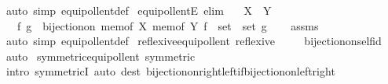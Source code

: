 \begin{isabellebody}
\ {\isacharparenleft}{\kern0pt}auto\ simp{\isacharcolon}{\kern0pt}\ equipollent{\isacharunderscore}{\kern0pt}def{\isacharparenright}{\kern0pt}%
\endisatagproof
{\isafoldproof}%
%
\isadelimproof
\isanewline
%
\endisadelimproof
\isanewline
{}\isamarkupfalse%
\ equipollentE\ {\isacharbrackleft}{\kern0pt}elim{\isacharbrackright}{\kern0pt}{\isacharcolon}{\kern0pt}\isanewline
\ \ \ {\isachardoublequoteopen}X\ {\isasymapprox}\ Y{\isachardoublequoteclose}\isanewline
\ \ \ f\ g\ \ {\isachardoublequoteopen}bijection{\isacharunderscore}{\kern0pt}on\ {\isacharparenleft}{\kern0pt}mem{\isacharunderscore}{\kern0pt}of\ X{\isacharparenright}{\kern0pt}\ {\isacharparenleft}{\kern0pt}mem{\isacharunderscore}{\kern0pt}of\ Y{\isacharparenright}{\kern0pt}\ {\isacharparenleft}{\kern0pt}f\ {\isacharcolon}{\kern0pt}{\isacharcolon}{\kern0pt}\ set\ {\isasymRightarrow}\ set{\isacharparenright}{\kern0pt}\ g{\isachardoublequoteclose}\isanewline
%
\isadelimproof
\ \ %
\endisadelimproof
%
\isatagproof
{}\isamarkupfalse%
\ assms\ \isamarkupfalse%
\ {\isacharparenleft}{\kern0pt}auto\ simp{\isacharcolon}{\kern0pt}\ equipollent{\isacharunderscore}{\kern0pt}def{\isacharparenright}{\kern0pt}%
\endisatagproof
{\isafoldproof}%
%
\isadelimproof
\isanewline
%
\endisadelimproof
\isanewline
{}\isamarkupfalse%
\ reflexive{\isacharunderscore}{\kern0pt}equipollent{\isacharcolon}{\kern0pt}\ {\isachardoublequoteopen}reflexive\ {\isacharparenleft}{\kern0pt}{\isasymapprox}{\isacharparenright}{\kern0pt}{\isachardoublequoteclose}\isanewline
%
\isadelimproof
\ \ %
\endisadelimproof
%
\isatagproof
{}\isamarkupfalse%
\ bijection{\isacharunderscore}{\kern0pt}on{\isacharunderscore}{\kern0pt}self{\isacharunderscore}{\kern0pt}id\ \isamarkupfalse%
\ auto%
\endisatagproof
{\isafoldproof}%
%
\isadelimproof
\isanewline
%
\endisadelimproof
\isanewline
{}\isamarkupfalse%
\ symmetric{\isacharunderscore}{\kern0pt}equipollent{\isacharcolon}{\kern0pt}\ {\isachardoublequoteopen}symmetric\ {\isacharparenleft}{\kern0pt}{\isasymapprox}{\isacharparenright}{\kern0pt}{\isachardoublequoteclose}\isanewline
%
\isadelimproof
\ \ %
\endisadelimproof
%
\isatagproof
{}\isamarkupfalse%
\ {\isacharparenleft}{\kern0pt}intro\ symmetricI{\isacharparenright}{\kern0pt}\ {\isacharparenleft}{\kern0pt}auto\ dest{\isacharcolon}{\kern0pt}\ bijection{\isacharunderscore}{\kern0pt}on{\isacharunderscore}{\kern0pt}right{\isacharunderscore}{\kern0pt}left{\isacharunderscore}{\kern0pt}if{\isacharunderscore}{\kern0pt}bijection{\isacharunderscore}{\kern0pt}on{\isacharunderscore}{\kern0pt}left{\isacharunderscore}{\kern0pt}right{\isacharparenright}{\kern0pt}%

\end{isabellebody}
